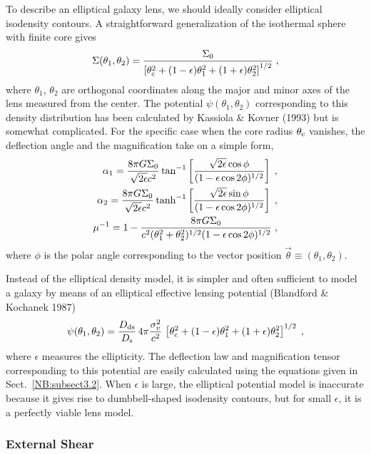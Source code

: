\documentclass[a4paper,10pt]{article} %
\begin{document}
To describe an elliptical galaxy lens, we should ideally consider
elliptical isodensity contours. A straightforward generalization of
the isothermal sphere with finite core gives
\begin{equation}
  \Sigma(\theta_1,\theta_2) = \frac{\Sigma_0}
  {\left[\theta_{\rm c}^2 + (1-\epsilon)\theta_1^2 +
  (1+\epsilon)\theta_2^2\right]^{1/2}}\;,
\label{eq:3.28}
\end{equation}
where $\theta_1$, $\theta_2$ are orthogonal coordinates along the
major and minor axes of the lens measured from the center. The
potential $\psi(\theta_1,\theta_2)$ corresponding to this density
distribution has been calculated by Kassiola \& Kovner (1993) but is
somewhat complicated. For the specific case when the core radius
$\theta_{\rm c}$ vanishes, the deflection angle and the magnification
take on a simple form,
\begin{eqnarray}
  \alpha_1={8\pi G\Sigma_0\over \sqrt{2\epsilon}c^2}\tan^{-1}
  \left[{\sqrt{2\epsilon}\cos\phi\over(1-\epsilon\cos2\phi)^{1/2}}
  \right]\;,\nonumber\\
  \alpha_2={8\pi G\Sigma_0\over \sqrt{2\epsilon}c^2}\tanh^{-1}
  \left[{\sqrt{2\epsilon}\sin\phi\over(1-\epsilon\cos2\phi)^{1/2}}
  \right]\;,\nonumber\\
  \mu^{-1}=1-{8\pi G\Sigma_0\over c^2(\theta_1^2+\theta_2^2)^{1/2}
  (1-\epsilon\cos 2\phi)^{1/2}}\;,
\end{eqnarray}
where $\phi$ is the polar angle corresponding to the vector position
$\vec\theta\equiv(\theta_1,\theta_2)$.

Instead of the elliptical density model, it is simpler and often
sufficient to model a galaxy by means of an elliptical effective
lensing potential (Blandford \& Kochanek 1987)
\begin{equation}
  \psi(\theta_1,\theta_2) = \frac{D_{\rm ds}}{D_{\rm s}}\,
  4\pi\frac{\sigma_v^2}{c^2}\,\left[\theta_{\rm c}^2 +
  (1-\epsilon)\theta_1^2 + (1+\epsilon)\theta_2^2\right]^{1/2}\;,
\label{eq:3.29}
\end{equation}
where $\epsilon$ measures the ellipticity. The deflection law and
magnification tensor corresponding to this potential are easily
calculated using the equations given in Sect.\
\ref{NB:subsect3.2}. When $\epsilon$ is large, the elliptical
potential model is inaccurate because it gives rise to dumbbell-shaped
isodensity contours, but for small $\epsilon$, it is a perfectly
viable lens model.

\subsubsection{External Shear}
\label{NB:subsubsect3.5.2}
\end{document}
